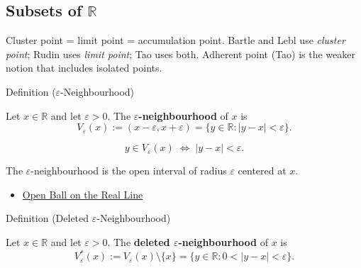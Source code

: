 
\subsection*{\texorpdfstring{Subsets of $\mathbb{R}$}{Subsets of R}}
\label{sec:subsets-of-R}
\begin{remark*}
Cluster point = limit point = accumulation point. Bartle and Lebl use
\emph{cluster point}; Rudin uses \emph{limit point}; Tao uses both.
Adherent point (Tao) is the weaker notion that includes isolated points.
\end{remark*}


\begin{definitionbox}{Definition ($\varepsilon$-Neighbourhood)}
\begin{definition}
\label{def:epsilon-neighbourhood}
Let $x\in\mathbb{R}$ and let $\varepsilon>0$. The
\textbf{$\varepsilon$-neighbourhood} of $x$ is
\[
  V_\varepsilon(x):=(x-\varepsilon,x+\varepsilon)
  =\{y\in\mathbb{R}: |y-x|<\varepsilon\}.
\]
\end{definition}
\end{definitionbox}

\begin{remark*}
\[
  y\in V_\varepsilon(x)\;\Longleftrightarrow\; |y-x|<\varepsilon.
\]
\end{remark*}

\begin{remark*}[Interpretation]
The $\varepsilon$-neighbourhood is the open interval of radius
$\varepsilon$ centered at $x$.
\end{remark*}

\begin{dependencies}
\begin{itemize}
  \item \hyperref[def:open-ball]{Open Ball on the Real Line}
\end{itemize}
\end{dependencies}

\begin{definitionbox}{Definition (Deleted $\varepsilon$-Neighbourhood)}
\begin{definition}
\label{def:deleted-epsilon-neighbourhood}
Let $x\in\mathbb{R}$ and let $\varepsilon>0$. The
\textbf{deleted $\varepsilon$-neighbourhood} of $x$ is
\[
  V_\varepsilon^*(x):=V_\varepsilon(x)\setminus\{x\}
  =\{y\in\mathbb{R}:0<|y-x|<\varepsilon\}.
\]
\end{definition}
\end{definitionbox}

